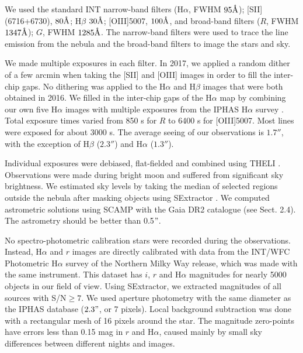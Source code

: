 \documentclass{aa}
\begin{document}
\par We used the standard INT narrow-band filters (H$\alpha$, FWHM
$95\mathrm{\AA}$); [SII](6716+6730), $80\mathrm{\AA}$; H$\beta$
$30\mathrm{\AA}$; [OIII]5007, $100\mathrm{\AA}$, and broad-band
filters ($R$, FWHM $1347\mathrm{\AA}$); $G$, FWHM $1285\mathrm{\AA}$.
The narrow-band filters were used to trace the line emission from the
nebula and the broad-band filters to image the stars and sky.

\par We made multiple exposures in each filter. In 2017, we applied a
random dither of a few arcmin when taking the [SII] and [OIII] images
in order to fill the inter-chip gaps.  No dithering was applied to the
H$\alpha$ and H$\beta$ images that were both obtained in 2016. We
filled in the inter-chip gaps of the H$\alpha$ map by combining our
own five H$\alpha$ images with multiple exposures from the IPHAS
H$\alpha$ survey \citep{iphas1}. Total exposure times varied from
850 s for $R$ to 6400 s for [OIII]5007. Most lines were exposed for
about 3000 s. The average seeing of our observations is $1.7''$,
with the exception of H$\beta$ ($2.3''$) and H$\alpha$ ($1.3''$).

\par Individual exposures were debiased, flat-fielded and combined
using THELI \citep{SchirmerTheli,ErbenTheli}. Observations were made
during bright moon and suffered from significant sky brightness. We
estimated sky levels by taking the median of selected regions outside
the nebula after masking objects using SExtractor
\citep{1996A&AS..117..393B}.  We computed astrometric solutions using
SCAMP \citep{2006ASPC..351..112B} with the Gaia DR2 catalogue (see
Sect. 2.4). The astrometry should be better than 0.5$"$.

\par No spectro-photometric calibration stars were recorded during the
observations. Instead, H$\alpha$ and $r$ images are directly
calibrated with data from the INT/WFC Photometric H$\alpha$ survey of
the Northern Milky Way \citep[IPHAS DR2][]{iphas1} release, which was
made with the same instrument. This dataset has $i$, $r$ and H$\alpha$
magnitudes for nearly 5000 objects in our field of view. Using
SExtractor, we extracted magnitudes of all sources with S/N$\geq7$. We
used aperture photometry with the same diameter as the IPHAS database
($2.3"$, or 7 pixels). Local background subtraction was done
with a rectangular mesh of 16 pixels around the star. The magnitude 
zero-points have errors less than 0.15 mag in $r$ and H$\alpha$, 
caused mainly by small sky differences between different nights and images.
\end{document}
